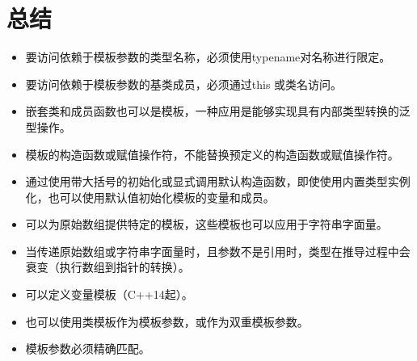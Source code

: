 \section{总结}

\begin{itemize}
\item 
要访问依赖于模板参数的类型名称，必须使用typename对名称进行限定。

\item 
要访问依赖于模板参数的基类成员，必须通过this\inlcpp{->} 或类名访问。

\item 
嵌套类和成员函数也可以是模板，一种应用是能够实现具有内部类型转换的泛型操作。

\item 
模板的构造函数或赋值操作符，不能替换预定义的构造函数或赋值操作符。

\item 
通过使用带大括号的初始化或显式调用默认构造函数，即使使用内置类型实例化，也可以使用默认值初始化模板的变量和成员。

\item 
可以为原始数组提供特定的模板，这些模板也可以应用于字符串字面量。

\item 
当传递原始数组或字符串字面量时，且参数不是引用时，类型在推导过程中会衰变（执行数组到指针的转换）。

\item 
可以定义变量模板（C++14起）。

\item 
也可以使用类模板作为模板参数，或作为双重模板参数。

\item 
模板参数必须精确匹配。
\end{itemize}